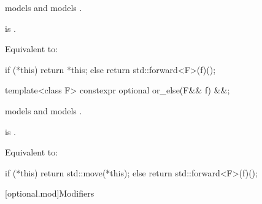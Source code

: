 \begin{itemdescr}
\pnum
\constraints
{} models  and
 models .

\pnum
\mandates
{} is .

\pnum
\effects
Equivalent to:
\begin{codeblock}
if (*this) {
  return *this;
} else {
  return std::forward<F>(f)();
}
\end{codeblock}
\end{itemdescr}

\begin{itemdecl}
template<class F> constexpr optional or_else(F&& f) &&;
\end{itemdecl}

\begin{itemdescr}
\pnum
\constraints
{} models  and
 models .

\pnum
\mandates
{} is .

\pnum
\effects
Equivalent to:
\begin{codeblock}
if (*this) {
  return std::move(*this);
} else {
  return std::forward<F>(f)();
}
\end{codeblock}
\end{itemdescr}

[optional.mod]{Modifiers}


